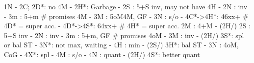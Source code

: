1N - 2C;
2D*: no 4M
   - 2H*: Garbage
   - 2S : 5+S inv, may not have 4H
   - 2N : inv
   - 3m : 5+m  # promises 4M
   - 3M : 5oM4M, GF
   - 3N : s/o
   - 4C*->4H*: 46xx+  # 4D* = super acc.
   - 4D*->4S*: 64xx+  # 4H* = super acc.
2M : 4+M
   - (2H/) 2S : 5+S inv
   - 2N : inv
   - 3m : 5+m, GF  # promises 4oM
   - 3M : inv
   - (2H/) 3S*: spl or bal ST
              - 3N*: not max, waiting
              - 4H : min
   - (2S/) 3H*: bal ST
   - 3N : 4oM, CoG
   - 4X*: spl
   - 4M : s/o
   - 4N : quant
   - (2H/) 4S*: better quant